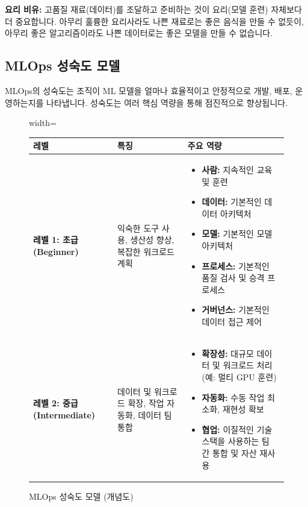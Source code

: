 \documentclass[11pt,a4paper]{article}
\begin{document}
\begin{tipbox}
\textbf{요리 비유:}
고품질 재료(데이터)를 조달하고 준비하는 것이 요리(모델 훈련) 자체보다 더 중요합니다. 아무리 훌륭한 요리사라도 나쁜 재료로는 좋은 음식을 만들 수 없듯이, 아무리 좋은 알고리즘이라도 나쁜 데이터로는 좋은 모델을 만들 수 없습니다.
\end{tipbox}

\subsection{MLOps 성숙도 모델}

MLOps의 성숙도는 조직이 ML 모델을 얼마나 효율적이고 안정적으로 개발, 배포, 운영하는지를 나타냅니다. 성숙도는 여러 핵심 역량을 통해 점진적으로 향상됩니다.

\begin{figure}[h!]
    \centering
    \caption{MLOps 성숙도 모델 (개념도)}
    \label{fig:mlops_maturity}
    \begin{adjustbox}{width=\textwidth}
    \begin{tabular}{p{} | p{} | p{}}
    \toprule
    \textbf{레벨} & \textbf{특징} & \textbf{주요 역량} \\
    \midrule
    \textbf{레벨 1: 초급 (Beginner)} & 익숙한 도구 사용, 생산성 향상, 복잡한 워크로드 계획 &
    \begin{itemize}
        \item \textbf{사람:} 지속적인 교육 및 훈련
        \item \textbf{데이터:} 기본적인 데이터 아키텍처
        \item \textbf{모델:} 기본적인 모델 아키텍처
        \item \textbf{프로세스:} 기본적인 품질 검사 및 승격 프로세스
        \item \textbf{거버넌스:} 기본적인 데이터 접근 제어
    \end{itemize} \\
    \midrule
    \textbf{레벨 2: 중급 (Intermediate)} & 데이터 및 워크로드 확장, 작업 자동화, 데이터 팀 통합 &
    \begin{itemize}
        \item \textbf{확장성:} 대규모 데이터 및 워크로드 처리 (예: 멀티 GPU 훈련)
        \item \textbf{자동화:} 수동 작업 최소화, 재현성 확보
        \item \textbf{협업:} 이질적인 기술 스택을 사용하는 팀 간 통합 및 자산 재사용
    \end{itemize} \\

\end{tabular}
\end{adjustbox}
\end{figure}
\end{document}
